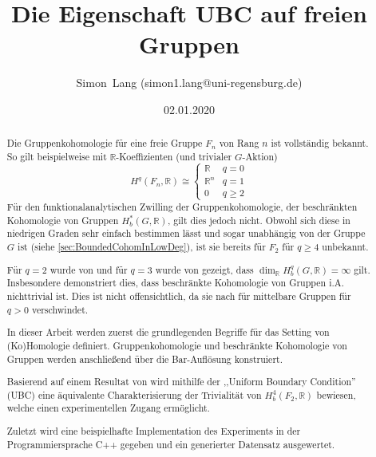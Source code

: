 \documentclass[a4paper,twoside,10pt]{scrreprt}
\author{Simon~Lang (\textsf{simon1.lang@uni-regensburg.de})}
\date{02.01.2020}
\title{Die Eigenschaft UBC auf freien Gruppen}
\newcommand{\R}{\mathbb{R}}
\theoremstyle{definition}
\begin{document}
\maketitle
\begin{abstract}
Die Gruppenkohomologie für eine freie Gruppe $F_n$ von Rang $n$ ist vollständig bekannt. So gilt beispielweise mit $\R$-Koeffizienten (und trivialer $G$-Aktion)
\begin{equation*}
H^q(F_n,\R)\cong
\begin{cases} 
      \R & q=0 \\
      \R^n & q=1 \\
      0 & q\geq 2
\end{cases}
\end{equation*}
Für den funktionalanalytischen Zwilling der Gruppenkohomologie, der beschränkten Kohomologie von Gruppen $H_b^*(G,\R)$, gilt dies jedoch nicht. Obwohl sich diese in niedrigen Graden sehr einfach bestimmen lässt und sogar unabhängig von der Gruppe $G$ ist (siehe \cref{sec:BoundedCohomInLowDeg}), ist sie bereits für $F_2$ für $q\geq 4$ unbekannt. \par
Für $q=2$ wurde von \autocite{mitsumatsu} und für $q=3$ wurde von \autocite{soma} gezeigt, dass $\dim_{\R} H_b^q(G,\R)=\infty$ gilt. Insbesondere demonstriert dies, dass beschränkte Kohomologie von Gruppen i.A. nichttrivial ist. Dies ist nicht offensichtlich, da sie nach \cite{gromov} für mittelbare Gruppen für $q>0$ verschwindet.\par
In dieser Arbeit werden zuerst die grundlegenden Begriffe für das  Setting von (Ko)Homologie definiert. Gruppenkohomologie und beschränkte Kohomologie von Gruppen werden anschließend über die Bar-Auflösung konstruiert.\par
Basierend auf einem Resultat von \cite{matsumoto} wird mithilfe der ,,Uniform Boundary Condition'' (UBC) eine äquivalente Charakterisierung der Trivialität von $H_b^4(F_2,\R)$ bewiesen, welche einen experimentellen Zugang ermöglicht.\par
Zuletzt wird eine beispielhafte Implementation des Experiments in der Programmiersprache C++ gegeben und ein generierter Datensatz ausgewertet.
\end{abstract}
\tableofcontents
\newpage
{}
\end{document}
